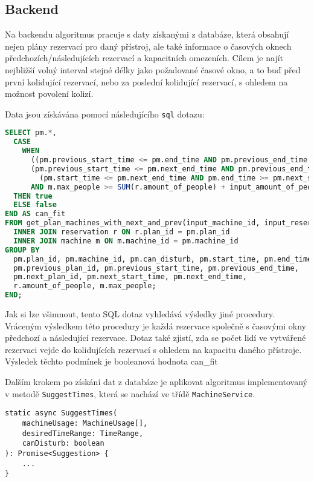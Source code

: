 \subsection{Backend}
Na backendu algoritmus pracuje s daty získanými z databáze, která obsahují nejen plány rezervací pro daný přístroj, ale také informace o časových oknech předchozích/následujících rezervací a kapacitních omezeních. Cílem je najít nejbližší volný interval stejné délky jako požadované časové okno, a to buď před první kolidující rezervací, nebo za poslední kolidující rezervací, s ohledem na možnost povolení kolizí.

Data jsou získávána pomocí následujícího \texttt{sql} dotazu:
\begin{lstlisting}[language=SQL]
SELECT pm.*,
  CASE
    WHEN
      ((pm.previous_start_time <= pm.end_time AND pm.previous_end_time >= pm.start_time) OR
      (pm.previous_start_time <= pm.next_end_time AND pm.previous_end_time >= pm.next_start_time) OR
        (pm.start_time <= pm.next_end_time AND pm.end_time >= pm.next_start_time))
      AND m.max_people >= SUM(r.amount_of_people) + input_amount_of_people
  THEN true
  ELSE false
END AS can_fit
FROM get_plan_machines_with_next_and_prev(input_machine_id, input_reservation_date) pm
  INNER JOIN reservation r ON r.plan_id = pm.plan_id
  INNER JOIN machine m ON m.machine_id = pm.machine_id
GROUP BY
  pm.plan_id, pm.machine_id, pm.can_disturb, pm.start_time, pm.end_time,
  pm.previous_plan_id, pm.previous_start_time, pm.previous_end_time,
  pm.next_plan_id, pm.next_start_time, pm.next_end_time,
  r.amount_of_people, m.max_people;
END;
\end{lstlisting}
Jak si lze všimnout, tento SQL dotaz vyhledává výsledky jiné procedury. Vráceným výsledkem této procedury je každá rezervace společně s časovými okny předchozí a následující rezervace.
Dotaz také zjistí, zda se počet lidí ve vytvářené rezervaci vejde do kolidujících rezervací s ohledem na kapacitu daného přístroje. Výsledek těchto podmínek je booleanová hodnota can\_fit

Dalším krokem po získání dat z databáze je aplikovat algoritmus implementovaný v metodě \texttt{SuggestTimes}, která se nachází ve třídě \texttt{MachineService}. 

\begin{lstlisting}
static async SuggestTimes(
    machineUsage: MachineUsage[],
    desiredTimeRange: TimeRange,
    canDisturb: boolean
): Promise<Suggestion> {
    ...
}
\end{lstlisting}

